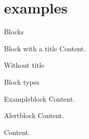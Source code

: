 \documentclass[
	ngerman,%
	authorontitle=true,
	]{bfhbeamer}
\begin{document}
\section{examples}\label{sec:examples}
\begin{frame}{Blocks}
	\begin{block}{Block with a title}
		Content.
	\end{block}
	\begin{block}{}
		Without title
	\end{block}
\end{frame}

\begin{frame}{Block types}
	\begin{exampleblock}{Exampleblock}
		Content.
	\end{exampleblock}
	\begin{alertblock}{Alertblock}
		Content.
	\end{alertblock}
	\begin{example}
		Content.
	\end{example}
\end{frame}
\end{document}
